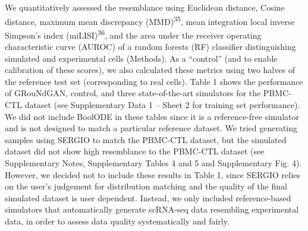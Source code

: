 We quantitatively assessed the resemblance using Euclidean distance, Cosine distance, maximum mean discrepancy (MMD)\textsuperscript{35}, mean integration local inverse Simpson’s index (miLISI)\textsuperscript{36}, and the area under the receiver operating characteristic curve (AUROC) of a random forests (RF) classifier distinguishing simulated and experimental cells (Methods). As a “control” (and to enable calibration of these scores), we also calculated these metrics using two halves of the reference test set (corresponding to real cells). Table 1 shows the performance of GRouNdGAN, control, and three state-of-the-art simulators for the PBMC-CTL dataset (see Supplementary Data 1 – Sheet 2 for training set performance). We did not include BoolODE in these tables since it is a reference-free simulator and is not designed to match a particular reference dataset. We tried generating samples using SERGIO to match the PBMC-CTL dataset, but the simulated dataset did not show high resemblance to the PBMC-CTL dataset (see Supplementary Notes, Supplementary Tables 4 and 5 and Supplementary Fig. 4). However, we decided not to include these results in Table 1, since SERGIO relies on the user’s judgement for distribution matching and the quality of the final simulated dataset is user dependent. Instead, we only included reference-based simulators that automatically generate scRNA-seq data resembling experimental data, in order to assess data quality systematically and fairly. %


